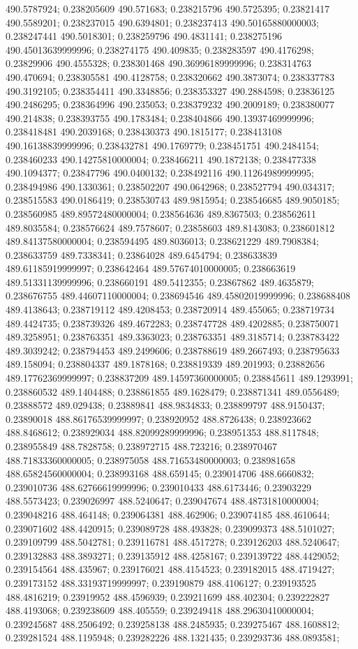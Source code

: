 490.5787924; 0.238205609 490.571683; 0.238215796 490.5725395; 0.23821417 490.5589201; 0.238237015 490.6394801; 0.238237413 490.50165880000003; 0.238247441 490.5018301; 0.238259796 490.4831141; 0.238275196 490.45013639999996; 0.238274175 490.409835; 0.238283597 490.4176298; 0.23829906 490.4555328; 0.238301468 490.36996189999996; 0.238314763 490.470694; 0.238305581 490.4128758; 0.238320662 490.3873074; 0.238337783 490.3192105; 0.238354411 490.3348856; 0.238353327 490.2884598; 0.23836125 490.2486295; 0.238364996 490.235053; 0.238379232 490.2009189; 0.238380077 490.214838; 0.238393755 490.1783484; 0.238404866 490.13937469999996; 0.238418481 490.2039168; 0.238430373 490.1815177; 0.238413108 490.16138839999996; 0.238432781 490.1769779; 0.238451751 490.2484154; 0.238460233 490.14275810000004; 0.238466211 490.1872138; 0.238477338 490.1094377; 0.23847796 490.0400132; 0.238492116 490.11264989999995; 0.238494986 490.1330361; 0.238502207 490.0642968; 0.238527794 490.034317; 0.238515583 490.0186419; 0.238530743 489.9815954; 0.238546685 489.9050185; 0.238560985 489.89572480000004; 0.238564636 489.8367503; 0.238562611 489.8035584; 0.238576624 489.7578607; 0.23858603 489.8143083; 0.238601812 489.84137580000004; 0.238594495 489.8036013; 0.238621229 489.7908384; 0.238633759 489.7338341; 0.23864028 489.6454794; 0.238633839 489.61185919999997; 0.238642464 489.57674010000005; 0.238663619 489.51331139999996; 0.238660191 489.5412355; 0.23867862 489.4635879; 0.238676755 489.44607110000004; 0.238694546 489.45802019999996; 0.238688408 489.4138643; 0.238719112 489.4208453; 0.238720914 489.455065; 0.238719734 489.4424735; 0.238739326 489.4672283; 0.238747728 489.4202885; 0.238750071 489.3258951; 0.238763351 489.3363023; 0.238763351 489.3185714; 0.238783422 489.3039242; 0.238794453 489.2499606; 0.238788619 489.2667493; 0.238795633 489.158094; 0.238804337 489.1878168; 0.238819339 489.201993; 0.23882656 489.17762369999997; 0.238837209 489.14597360000005; 0.238845611 489.1293991; 0.238860532 489.1404488; 0.238861855 489.1628479; 0.238871341 489.0556489; 0.23888572 489.029438; 0.23889841 488.9834833; 0.238899797 488.9150437; 0.23890018 488.86176539999997; 0.238920952 488.8726438; 0.238923662 488.8468612; 0.238929034 488.82099289999996; 0.238951353 488.8117848; 0.238955849 488.7828758; 0.238972715 488.723216; 0.238970467 488.71833360000005; 0.238975058 488.71653480000003; 0.238981658 488.65824560000004; 0.238993168 488.659145; 0.239014706 488.6660832; 0.239010736 488.62766619999996; 0.239010433 488.6173446; 0.23903229 488.5573423; 0.239026997 488.5240647; 0.239047674 488.48731810000004; 0.239048216 488.464148; 0.239064381 488.462906; 0.239074185 488.4610644; 0.239071602 488.4420915; 0.239089728 488.493828; 0.239099373 488.5101027; 0.239109799 488.5042781; 0.239116781 488.4517278; 0.239126203 488.5240647; 0.239132883 488.3893271; 0.239135912 488.4258167; 0.239139722 488.4429052; 0.239154564 488.435967; 0.239176021 488.4154523; 0.239182015 488.4719427; 0.239173152 488.33193719999997; 0.239190879 488.4106127; 0.239193525 488.4816219; 0.23919952 488.4596939; 0.239211699 488.402304; 0.239222827 488.4193068; 0.239238609 488.405559; 0.239249418 488.29630410000004; 0.239245687 488.2506492; 0.239258138 488.2485935; 0.239275467 488.1608812; 0.239281524 488.1195948; 0.239282226 488.1321435; 0.239293736 488.0893581; 